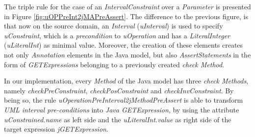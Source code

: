 \documentclass[tuberlin,cic,tc,english,noabntcite,oneside]{iiufrgs}
\begin{document}
The triple rule for the case of an \emph{IntervalConstraint} over a \emph{Parameter} is presented in Figure \ref{fig:uOPPreInt2jMAPreAssert}. The difference to the previous figure, is that now on the source domain, an \emph{Interval} (\emph{uInterval}) is used to specify \emph{uConstraint}, which is a \emph{precondition} to \emph{uOperation} and has a \emph{LiteralInteger} (\emph{uLiteralInt}) as minimal value. Moreover, the creation of these elements creates not only \emph{Annotation} elements in the Java model, but also \emph{AssertStatements} in the form of \emph{GETExpressions} belonging to a previously created \emph{check Method}. 

In our implementation, every \emph{Method} of the Java model has three \emph{check Methods}, namely \emph{checkPreConstraint}, \emph{checkPosConstraint} and \emph{checkInvConstraint}. By being so, the rule \emph{uOperationPreInterval2jMethodPreAssert} is able to transform \emph{UML interval pre-conditions} into \emph{Java GETExpression}, by using the attribute \emph{uConstrained.name} as left side and the \emph{uLiteralInt.value} as right side of the target expression \emph{jGETExpression}.
\end{document}
